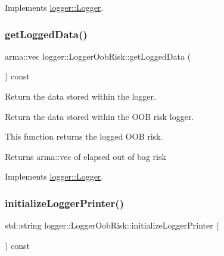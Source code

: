 Implements \mbox{\hyperlink{classlogger_1_1_logger_a8c68db2430fa84b67528bfa6ae45a516}{logger\+::\+Logger}}.

\mbox{\label{classlogger_1_1_logger_oob_risk_a1529f62cf58ad8bc5922a7d39ed3515e}} 
\subsubsection{\texorpdfstring{get\+Logged\+Data()}{getLoggedData()}}
{\footnotesize\ttfamily arma\+::vec logger\+::\+Logger\+Oob\+Risk\+::get\+Logged\+Data (\begin{DoxyParamCaption}{ }\end{DoxyParamCaption}) const\hspace{0.3cm}{\ttfamily [virtual]}}



Return the data stored within the logger. 

Return the data stored within the O\+OB risk logger.

This function returns the logged O\+OB risk.

\begin{DoxyReturn}{Returns}
{\ttfamily arma\+::vec} of elapsed out of bag risk 
\end{DoxyReturn}


Implements \mbox{\hyperlink{classlogger_1_1_logger_aa4fc254c532172db3404b7c0bcd17092}{logger\+::\+Logger}}.

\mbox{\label{classlogger_1_1_logger_oob_risk_ac8b1b8a148878c38b1206fb00e0263f4}} 
\subsubsection{\texorpdfstring{initialize\+Logger\+Printer()}{initializeLoggerPrinter()}}
{\footnotesize\ttfamily std\+::string logger\+::\+Logger\+Oob\+Risk\+::initialize\+Logger\+Printer (\begin{DoxyParamCaption}{ }\end{DoxyParamCaption}) const\hspace{0.3cm}{\ttfamily [virtual]}}



